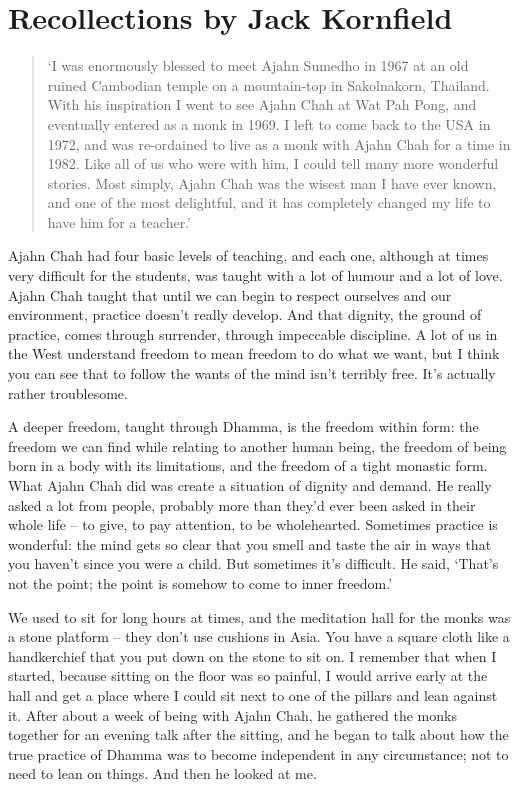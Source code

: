 
\chapter{Recollections by Jack Kornfield}

\begin{quote}
`I was enormously blessed to meet Ajahn Sumedho in 1967 at
an old ruined Cambodian temple on a mountain-top in Sakolnakorn, 
Thailand. With his inspiration I went to see Ajahn Chah at Wat Pah Pong, 
and eventually entered as a monk in 1969. I left to come back to the USA
in 1972, and was re-ordained to live as a monk with Ajahn Chah for a
time in 1982. Like all of us who were with him, I could tell many more
wonderful stories. Most simply, Ajahn Chah was the wisest man I have ever known, and one of
the most delightful, and it has completely
changed my life to have him for a teacher.'
\end{quote}

\noindent
Ajahn Chah had four basic levels of teaching, and each one, although at
times very difficult for the students, was taught with a lot of humour
and a lot of love. Ajahn Chah taught that until we can begin to respect
ourselves and our environment, practice doesn't really develop. And that
dignity, the ground of practice, comes through surrender, through
impeccable discipline. A lot of us in the West understand freedom to
mean freedom to do what we want, but I think you can see that to follow
the wants of the mind isn't terribly free. It's actually rather
troublesome. 

A deeper freedom, taught through Dhamma, is the freedom within form: the
freedom we can find while relating to another human being, the freedom
of being born in a body with its limitations, and the freedom of a tight
monastic form. What Ajahn Chah did was create a situation of dignity and
demand. He really asked a lot from people, probably more than they'd
ever been asked in their whole life -- to give, to pay attention, to be
wholehearted. Sometimes practice is wonderful: the mind gets so clear
that you smell and taste the air in ways that you haven't since
you were a child. But sometimes it's difficult. He said, `That's not the
point; the point is somehow to come to inner freedom.'

We used to sit for long hours at times, and the meditation hall for the
monks was a stone platform -- they don't use cushions in Asia. You have a
square cloth like a handkerchief that you put down on the stone to sit
on. I remember that when I started, because sitting on the floor was so
painful, I would arrive early at the hall and get a place where I could
sit next to one of the pillars and lean against it. After about a week
of being with Ajahn Chah, he gathered the monks together for an evening
talk after the sitting, and he began to talk about how the true practice
of Dhamma was to become independent in any circumstance; not to need to
lean on things. And then he looked at me. 

